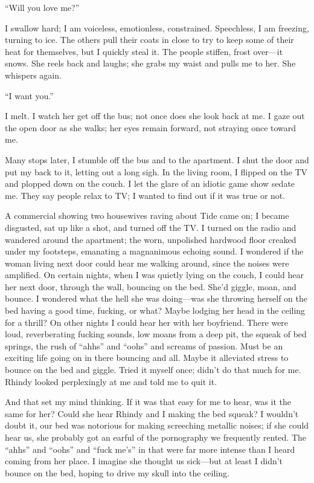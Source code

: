 ``Will you love me?''

I swallow hard; I am voiceless, emotionless, constrained. Speechless, I
am freezing, turning to ice. The others pull their coats in close to try
to keep some of their heat for themselves, but I quickly steal it. The
people stiffen, frost over---it snows. She reels back and laughs; she
grabs my waist and pulls me to her. She whispers again.

``I want you.''

I melt. I watch her get off the bus; not once does she look back at me.
I gaze out the open door as she walks; her eyes remain forward, not
straying once toward me.

Many stops later, I stumble off the bus and to the apartment. I shut the
door and put my back to it, letting out a long sigh. In the living room,
I flipped on the TV and plopped down on the couch. I let the glare of an
idiotic game show sedate me. They say people relax to TV; I wanted to
find out if it was true or not.

A commercial showing two housewives raving about Tide came on; I became
disgusted, sat up like a shot, and turned off the TV. I turned on the
radio and wandered around the apartment; the worn, unpolished hardwood
floor creaked under my footsteps, emanating a magnanimous echoing sound.
I wondered if the woman living next door could hear me walking around,
since the noises were amplified. On certain nights, when I was quietly
lying on the couch, I could hear her next door, through the wall,
bouncing on the bed. She'd giggle, moan, and bounce. I wondered what the
hell she was doing---was she throwing herself on the bed having a good
time, fucking, or what? Maybe lodging her head in the ceiling for a
thrill? On other nights I could hear her with her boyfriend. There were
loud, reverberating fucking sounds, low moans from a deep pit, the
squeak of bed springs, the rush of ``ahhs'' and ``oohs'' and screams of
passion. Must be an exciting life going on in there bouncing and all.
Maybe it alleviated stress to bounce on the bed and giggle. Tried it
myself once; didn't do that much for me. Rhindy looked perplexingly at
me and told me to quit it.

And that set my mind thinking. If it was that easy for me to hear, was
it the same for her? Could she hear Rhindy and I making the bed squeak?
I wouldn't doubt it, our bed was notorious for making screeching
metallic noises; if she could hear us, she probably got an earful of the
pornography we frequently rented. The ``ahhs'' and ``oohs'' and ``fuck
me's'' in that were far more intense than I heard coming from her place.
I imagine she thought us sick---but at least I didn't bounce on the bed,
hoping to drive my skull into the ceiling.

